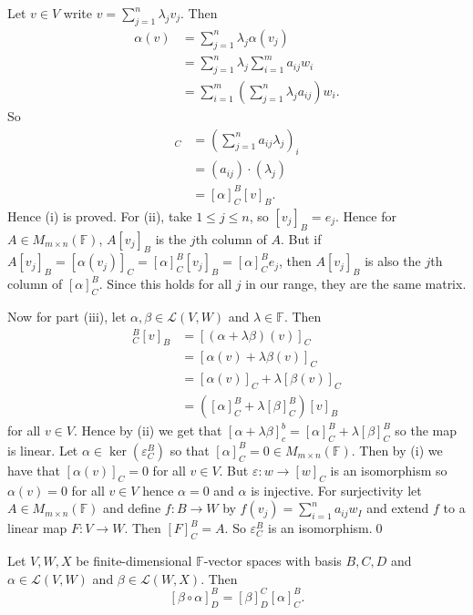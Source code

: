 \documentclass{article}
\newcommand{\F}{\mathbb{F}}
\begin{document}
\pf Let $ v\in V $ write $ v=\sum_{j=1}^n\lambda_jv_j $. Then
\begin{align*}
	\alpha(v)&=\sum_{j=1}^n\lambda_j\alpha(v_j)\\
		 &=\sum_{j=1}^n\lambda_j\sum_{i=1}^ma_{ij}w_i\\
		 &=\sum_{i=1}^m\left(\sum_{j=1}^n\lambda_ja_{ij}\right)w_i.
\end{align*}
So
\begin{align*}
	[\alpha(v)]_C&=\left(\sum_{j=1}^n a_{ij}\lambda_j\right)_i\\
		     &=(a_{ij})\cdot(\lambda_j)\\
		     &=[\alpha]^B_C[v]_B.
\end{align*}
Hence (i) is proved. For (ii), take $ 1\le j\le n $, so $ [v_j]_B=e_j $. Hence for $ A\in M_{m\times n}(\F) $, $ A[v_j]_B $ is the $ j $th column of $ A $. But if $ A[v_j]_B=[\alpha(v_j)]_C=[\alpha]^B_C[v_j]_B=[\alpha]^B_Ce_j $, then $ A[v_j]_B $ is also the $ j $th column of $ [\alpha]^B_C $. Since this holds for all $ j $ in our range, they are the same matrix.\par
Now for part (iii), let $ \alpha,\beta\in\mathcal L(V,W) $ and $ \lambda\in \F $. Then
\begin{align*}
	[\alpha+\lambda\beta]^B_C[v]_B&=[(\alpha+\lambda\beta)(v)]_C\\
				      &=[\alpha(v)+\lambda\beta(v)]_C\\
				      &= [\alpha(v)]_C+\lambda[\beta(v)]_C\\
				      &= ([\alpha]^B_C+\lambda[\beta]^B_C)[v]_B
\end{align*}
for all $ v\in V $. Hence by (ii) we get that $ [\alpha+\lambda\beta]^b_c=[\alpha]_C^B+\lambda[\beta]^B_C $ so the map is linear. Let $ \alpha\in\ker(\varepsilon_C^B) $ so that $ [\alpha]^B_C=0\in M_{m\times n} (\F)$. Then by (i) we have that $ [\alpha(v)]_C=0 $ for all $ v\in V $. But $ \varepsilon:w\to [w]_C $ is an isomorphism so $ \alpha(v)=0 $ for all $ v\in V $ hence $ \alpha=0 $ and $ \alpha $ is injective. For surjectivity let $ A\in M_{m\times n}(\F) $ and define $ f:B\to W $ by $ f(v_j)=\sum_{i=1}^na_{ij}w_I $ and extend $ f $ to a linear map $ F:V\to W $. Then $ [F]_C^B=A $. So $ \varepsilon_C^B $ is an isomorphism.\qed
\begin{proposition}
  Let $ V,W,X $ be finite-dimensional $ \F $-vector spaces with basis $ B,C,D $ and $ \alpha\in\mathcal L(V,W) $ and $ \beta\in\mathcal L(W,X) $. Then
  \[
	  [\beta\circ \alpha]^B_D=[\beta]^C_D[\alpha]^B_C.
  \]
\end{proposition}
\end{document}
